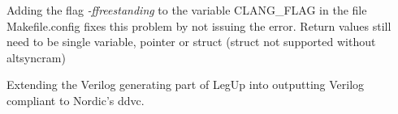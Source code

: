 Adding the flag \textit{-ffreestanding} to the variable CLANG\_FLAG in the file Makefile.config fixes this problem by not issuing the error. Return values still need to be single variable, pointer or struct (struct not supported without altsyncram)

Extending the Verilog generating part of LegUp into outputting Verilog compliant to Nordic's \gls{ddvc}.